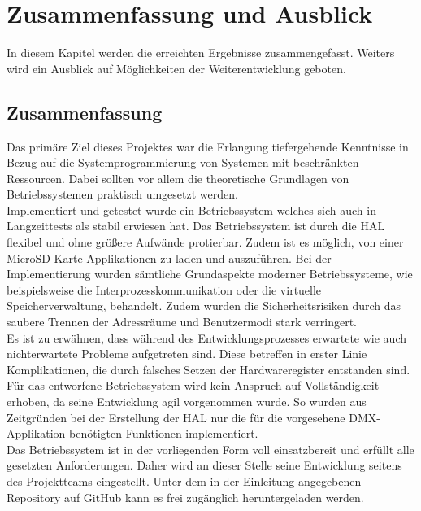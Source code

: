 \section{Zusammenfassung und Ausblick}

In diesem Kapitel werden die erreichten Ergebnisse zusammengefasst. Weiters wird ein Ausblick auf Möglichkeiten der Weiterentwicklung geboten.

\subsection{Zusammenfassung}

Das primäre Ziel dieses Projektes war die Erlangung tiefergehende Kenntnisse in Bezug auf die Systemprogrammierung von Systemen mit beschränkten Ressourcen. Dabei sollten vor allem die theoretische Grundlagen von Betriebssystemen praktisch umgesetzt werden. \\
 
Implementiert und getestet wurde ein Betriebssystem welches sich auch in Langzeittests als stabil erwiesen hat. Das Betriebssystem ist durch die HAL flexibel und ohne größere Aufwände protierbar. Zudem ist es möglich, von einer MicroSD-Karte Applikationen zu laden und auszuführen. 
Bei der Implementierung wurden sämtliche Grundaspekte moderner Betriebssysteme, wie beispielsweise die Interprozesskommunikation oder die virtuelle Speicherverwaltung, behandelt. Zudem wurden die Sicherheitsrisiken durch das saubere Trennen der Adressräume und Benutzermodi stark verringert. \\
 
Es ist zu erwähnen, dass während des Entwicklungsprozesses erwartete wie auch nichterwartete Probleme aufgetreten sind. Diese betreffen in erster Linie Komplikationen, die durch falsches Setzen der Hardwareregister entstanden sind. \\
 
Für das entworfene Betriebssystem wird kein Anspruch auf Vollständigkeit erhoben, da seine Entwicklung agil vorgenommen wurde. So wurden aus Zeitgründen bei der Erstellung der HAL nur die für die vorgesehene DMX-Applikation benötigten Funktionen implementiert. \\
 
Das Betriebssystem ist in der vorliegenden Form voll einsatzbereit und erfüllt alle gesetzten Anforderungen. Daher wird an dieser Stelle seine Entwicklung seitens des Projektteams eingestellt. Unter dem in der Einleitung angegebenen Repository auf GitHub kann es frei zugänglich heruntergeladen werden. \\


